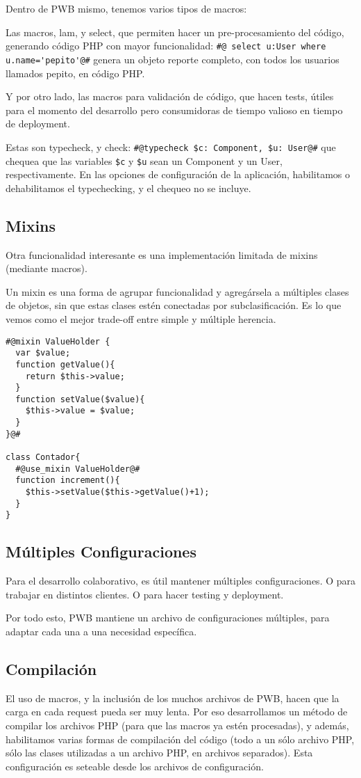 Dentro de PWB mismo, tenemos varios tipos de macros:

Las macros, lam, y select, que permiten hacer un pre-procesamiento del código, generando código PHP con
mayor funcionalidad:
\verb"#@ select u:User where u.name='pepito'@#"
genera un objeto reporte completo, con todos los usuarios llamados pepito, en código PHP.

Y por otro lado, las macros para validación de código, que hacen tests, útiles para el momento del desarrollo
pero consumidoras de tiempo valioso en tiempo de deployment.

Estas son typecheck, y check:
\verb"#@typecheck $c: Component, $u: User@#"
que chequea que las variables \verb"$c" y \verb"$u" sean un Component y un User, respectivamente. En las opciones de
configuración de la aplicación, habilitamos o dehabilitamos el typechecking, y el chequeo no se incluye.

\subsection{Mixins}
\label{sub-mixins}
Otra funcionalidad interesante es una implementación limitada de mixins (mediante macros).

Un mixin es una forma de agrupar funcionalidad y agregársela a múltiples clases de objetos, sin que estas
clases estén conectadas por subclasificación. Es lo que vemos como el mejor trade-off entre simple y múltiple
herencia.

\begin{verbatim}
#@mixin ValueHolder {
  var $value;
  function getValue(){
    return $this->value;
  }
  function setValue($value){
    $this->value = $value;
  }
}@#

class Contador{
  #@use_mixin ValueHolder@#
  function increment(){
    $this->setValue($this->getValue()+1);
  }
}
\end{verbatim}
\subsection{Múltiples Configuraciones}

Para el desarrollo colaborativo, es útil mantener múltiples configuraciones. O para trabajar en distintos clientes. O para hacer testing y deployment.

Por todo esto, PWB mantiene un archivo de configuraciones múltiples, para adaptar cada una a una necesidad
específica.

\subsection{Compilación}

El uso de macros, y la inclusión de los muchos archivos de PWB, hacen que la carga en cada request pueda ser muy lenta. Por eso desarrollamos un método de compilar los archivos PHP (para que las macros ya estén procesadas), y además, habilitamos varias formas de compilación del código (todo a un sólo archivo PHP, sólo las clases utilizadas a un archivo PHP, en archivos separados). Esta configuración es seteable desde los archivos de configuración.
